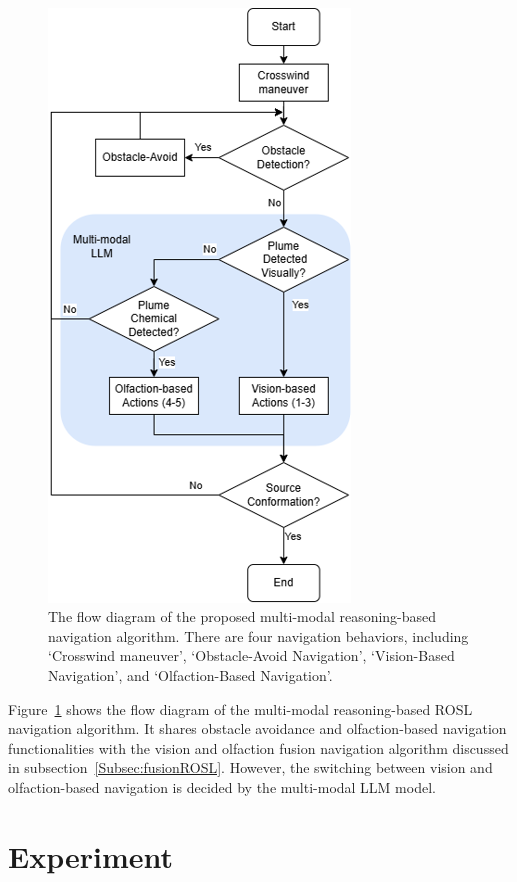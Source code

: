 \begin{figure}[h!] %
\ \\
\vspace*{-.18in}
\begin{center}
\includegraphics[width=0.5\columnwidth]{Main/Figure/LLMFlow.png}\hspace*{0.04in}
\end{center}
\vspace{-.1in}

\caption
{
The flow diagram of the proposed multi-modal reasoning-based navigation algorithm. There are four navigation behaviors, including `Crosswind maneuver', `Obstacle-Avoid Navigation', `Vision-Based Navigation', and `Olfaction-Based Navigation'.}
\label{fig:LLM_flow}
\end{figure}

Figure~\ref{fig:LLM_flow} shows the flow diagram of the multi-modal reasoning-based ROSL navigation algorithm. It shares obstacle avoidance and olfaction-based navigation functionalities with the vision and olfaction fusion navigation algorithm discussed in subsection~\ref{Subsec:fusionROSL}. However, the switching between vision and olfaction-based navigation is decided by the multi-modal LLM model.

\section{Experiment}
